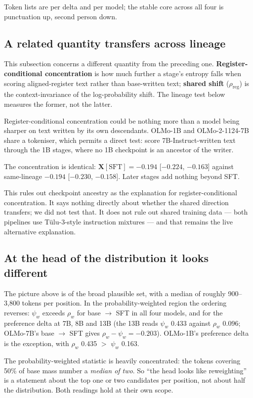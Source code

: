 \documentclass[11pt]{article}
\newcommand{\rreg}{\rho_{\mathrm{reg}}}
\begin{document}
Token lists are per delta and per model; the stable core across all four is
punctuation up, second person down.

\subsection{A related quantity transfers across lineage}
\label{sec:lineage}

This subsection concerns a different quantity from the preceding one.
\textbf{Register-conditional concentration} is how much further a stage's entropy
falls when scoring aligned-register text rather than base-written text;
\textbf{shared shift} ($\rreg$) is the context-invariance of the log-probability
shift. The lineage test below measures the former, not the latter.

Register-conditional concentration could be nothing more than a model being sharper
on text written by its own descendants. OLMo-1B and OLMo-2-1124-7B share a
tokeniser, which permits a direct test: score 7B-Instruct-written text through the
1B stages, where no 1B checkpoint is an ancestor of the writer.

The concentration is identical: $\mathbf{X[\mathrm{SFT}] = -0.194}$ [$-0.224$,
$-0.163$] against same-lineage $-0.194$ [$-0.230$, $-0.158$]. Later stages add
nothing beyond SFT.

This rules out checkpoint ancestry as the explanation for register-conditional
concentration. It says nothing directly about whether the shared direction
transfers; we did not test that. It does not rule out shared training data --- both
pipelines use T\"ulu-3-style instruction mixtures --- and that remains the live
alternative explanation.

\subsection{At the head of the distribution it looks different}
\label{sec:head}

The picture above is of the broad plausible set, with a median of roughly
900--3{,}800 tokens per position. In the probability-weighted region the ordering
reverses: $\psi_w$ exceeds $\rho_w$ for base $\to$ SFT in all four models, and for
the preference delta at 7B, 8B and 13B (the 13B reads $\psi_w$ 0.433 against
$\rho_w$ 0.096; OLMo-7B's base $\to$ SFT gives $\rho_w - \psi_w = -0.203$).
OLMo-1B's preference delta is the exception, with $\rho_w$ 0.435 $>$ $\psi_w$
0.163.

The probability-weighted statistic is heavily concentrated: the tokens covering
50\% of base mass number a \emph{median of two}. So ``the head looks like
reweighting'' is a statement about the top one or two candidates per position, not
about half the distribution. Both readings hold at their own scope.
\end{document}
